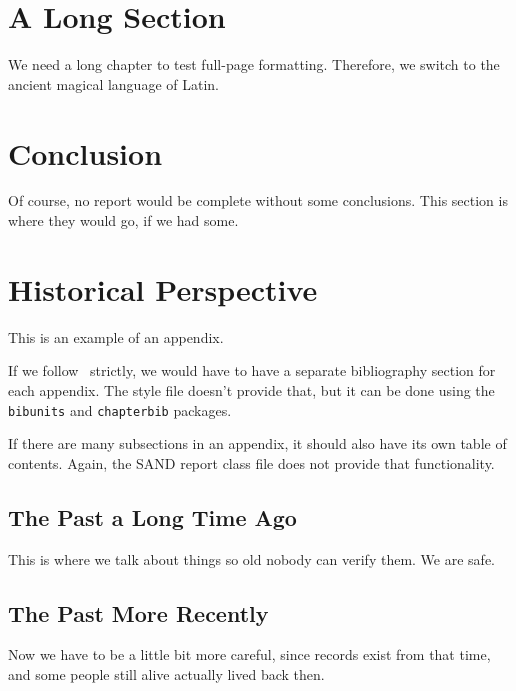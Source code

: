 \documentclass[pdf,ps2pdf,12pt,strict,OUO]{SANDreport}
\begin{document}
    \section{A Long Section}\label{sec:long}
	We need a long chapter to test full-page formatting. Therefore,
	we switch to the ancient magical language of Latin.

	


    \section{Conclusion}
	Of course, no report would be complete without some conclusions.
	This section is where they would go, if we had some.

    \nocite{*}


    \clearpage
    \providecommand*{\phantomsection}{}
    \phantomsection
    
    


    \appendix
    \section{Historical Perspective}
	This is an example of an appendix.

	If we follow~\cite{Sand98-0730} strictly, we would have to
	have a separate bibliography section for each appendix.
	The style file doesn't provide that, but it can be done
	using the {\tt bibunits} and {\tt chapterbib} packages.

	If there are many subsections in an appendix, it should also
	have its own table of contents. Again, the SAND report class
	file does not provide that functionality.

	\subsection{The Past a Long Time Ago}
	    This is where we talk about things so old nobody
	    can verify them. We are safe.

	\subsection{The Past More Recently}
	    Now we have to be a little bit more careful, since
	    records exist from that time, and some people still
	    alive actually lived back then.
\end{document}

